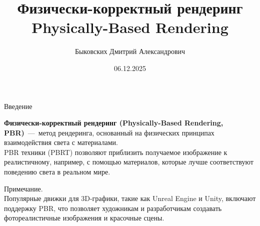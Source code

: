 \documentclass{beamer}
\title[Физически-корректный рендеринг]{Физически-корректный рендеринг \\ Physically-Based Rendering}
\author[Быковских Д.А.]{Быковских Дмитрий Александрович}
\date{06.12.2025}
\begin{document}
	\begin{frame}
		\titlepage
	\end{frame}
	\begin{frame}{Введение}
		
		\textbf{Физически-корректный рендеринг (Physically-Based Rendering, PBR)}~---~метод рендеринга, основанный на физических принципах взаимодействия света с материалами. \\

		PBR техники (PBRT) позволяют приблизить получаемое изображение к реалистичному, например, с помощью материалов, которые лучше соответствуют поведению света в реальном мире.
		
	
		\vspace{2mm}
		Примечание.\\
		Популярные движки для 3D-графики, такие как Unreal Engine и Unity, включают поддержку PBR, что позволяет художникам и разработчикам создавать фотореалистичные изображения и красочные сцены.



		


\end{frame}
\end{document}
